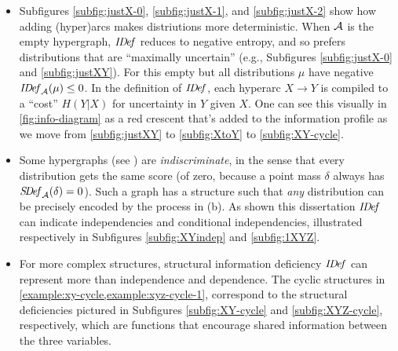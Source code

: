 \begin{itemize}
	\item
Subfigures \ref{subfig:justX-0}, \ref{subfig:justX-1}, 
    and \ref{subfig:justX-2} show
    how adding (hyper)arcs makes distriutions more deterministic.
When $\mathcal A$ is the empty hypergraph, $\mathit{I\mskip-3.0muD\mskip-2.5mue\mskip-1.5muf}$ reduces to negative entropy,
and so prefers distributions that are ``maximally uncertain''
 	(e.g., Subfigures \ref{subfig:justX-0} and \ref{subfig:justXY}).
For this empty
    but all distributions $\mu$ have negative $\mathit{I\mskip-3.0muD\mskip-2.5mue\mskip-1.5muf}_{\mathcal A}(\mu) \le 0$.
In the definition of $\mathit{I\mskip-3.0muD\mskip-2.5mue\mskip-1.5muf}$, each hyperarc $X\to Y$ is compiled to a ``cost'' $H(Y|X)$ 
    for uncertainty in $Y$ given $X$.
One can see this visually in \cref{fig:info-diagram}
    as a red crescent that's added to the information profile as we move 
    from \ref{subfig:justXY} to \ref{subfig:XtoY} to \ref{subfig:XY-cycle}.

\item
Some hypergraphs (see ) are \emph{indiscriminate}, in the sense that every distribution gets the same score
(of zero, because a point mass $\delta$ always has $\mathit{S\mskip-3.5muD\mskip-2.5mue\mskip-1.5muf}_{\mathcal A}(\delta) = 0$).
Such a graph has a structure such that \emph{any} distribution can be precisely encoded by the process in (b).
As shown this dissertation
 $\mathit{I\mskip-3.0muD\mskip-2.5mue\mskip-1.5muf}$ can indicate independencies and conditional independencies, illustrated respectively in Subfigures \ref{subfig:XYindep} and \ref{subfig:1XYZ}.

\item
For more complex structures, structural information deficiency $\mathit{I\mskip-3.0muD\mskip-2.5mue\mskip-1.5muf}$ 
can represent more than independence and dependence. 
The cyclic structures in \cref{example:xy-cycle,example:xyz-cycle-1}, 
    correspond to the structural deficiencies pictured
    in Subfigures \ref{subfig:XY-cycle} and \ref{subfig:XYZ-cycle}, respectively,
    which are functions that encourage shared information between the three variables. 

\end{itemize}
